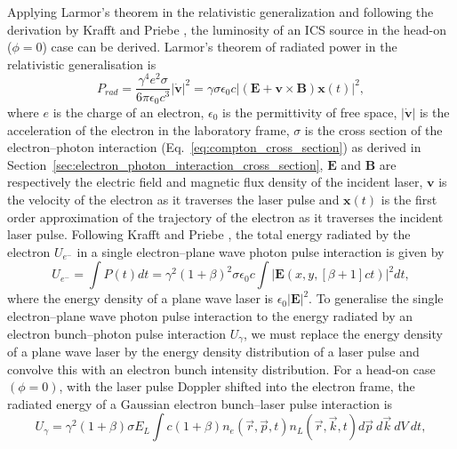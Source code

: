 \documentclass[../main.tex]{subfiles}
\begin{document}
Applying Larmor's theorem \cite{larmor1897lxiii,purcell1965electricity} in the relativistic generalization \cite{jackson1999classical} and following the derivation by Krafft and Priebe \cite{krafft2010compton}, the luminosity of an ICS source in the head-on ($\phi=0$) case can be derived. Larmor's theorem of radiated power in the relativistic generalisation is 
\begin{equation}
P_{rad} = \frac{\gamma^{4}e^{2}\sigma}{6\pi \epsilon_{0}c^{3}}\lvert\dot{\boldsymbol{v}}\rvert^{2} = \gamma\sigma\epsilon_{0}c\lvert\left(\boldsymbol{E}+\boldsymbol{v}\times\boldsymbol{B}\right)\boldsymbol{x}\left(t\right)\rvert^{2},
\label{eq:larmor_formula}    
\end{equation}
where $e$ is the charge of an electron, $\epsilon_{0}$ is the permittivity of free space, $\lvert\dot{\boldsymbol{v}}\rvert$ is the acceleration of the electron in the laboratory frame, $\sigma$ is the cross section of the electron--photon interaction (Eq.~\ref{eq:compton_cross_section}) as derived in Section~\ref{sec:electron_photon_interaction_cross_section}, $\boldsymbol{E}$ and $\boldsymbol{B}$ are respectively the electric field and magnetic flux density of the incident laser, $\boldsymbol{v}$ is the velocity of the electron as it traverses the laser pulse and $\boldsymbol{x}\left(t\right)$ is the first order approximation of the trajectory of the electron as it traverses the incident laser pulse. 
Following Krafft and Priebe \cite{krafft2010compton}, the total energy radiated by the electron $U_{e^{-}}$ in a single electron--plane wave photon pulse interaction is given by 
\begin{equation}
U_{e^{-}} = \int P\left(t\right)dt = \gamma^{2}\left(1+\beta\right)^{2}\sigma\epsilon_{0}c\int\lvert\boldsymbol{E}\left(x,y,\left[\beta+1\right]ct\right)\rvert^{2}dt,
\label{eq:electron_radiated_energy}
\end{equation}
where the energy density of a plane wave laser is $\epsilon_{0}\lvert\boldsymbol{E}\rvert^{2}$. To generalise the single electron--plane wave photon pulse interaction to the energy radiated by an electron bunch--photon pulse interaction $U_{\gamma}$, we must replace the energy density of a plane wave laser by the energy density distribution of a laser pulse and convolve this with an electron bunch intensity distribution. For a head-on case $\left(\phi=0\right)$, with the laser pulse Doppler shifted into the electron frame, the radiated energy of a Gaussian electron bunch--laser pulse interaction is    
\begin{equation}
U_{\gamma} = \gamma^{2}\left(1+\beta\right)\sigma E_{L}\int c\left(1+\beta\right) n_{e}\left(\overrightarrow{r},\overrightarrow{p},t\right)n_{L}\left(\overrightarrow{r},\overrightarrow{k},t\right) d\overrightarrow{p}~d\overrightarrow{k}~dV~dt,
\label{eq:total_interaction_energy}
\end{equation}
\end{document}
